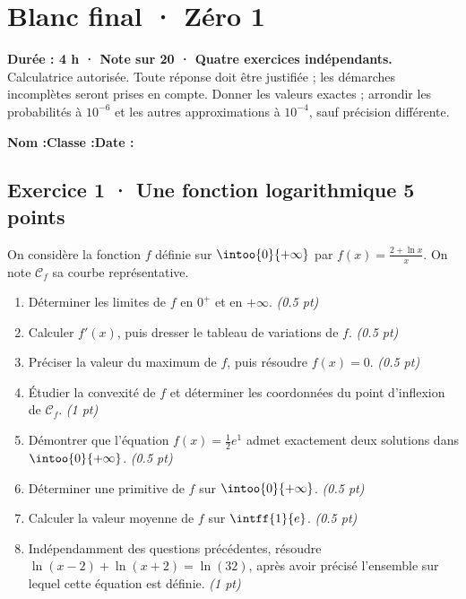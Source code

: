 \mxnewpage{}\label{sujet:9-1}

\section*{Blanc final · Zéro 1}


\textbf{Durée : 4 h · Note sur 20 · Quatre exercices indépendants.}\\Calculatrice autorisée. Toute réponse doit être justifiée ; les démarches incomplètes seront prises en compte. Donner les valeurs exactes ; arrondir les probabilités à $10^{-6}$ et les autres approximations à $10^{-4}$, sauf précision différente.

\smallskip\textbf{Nom :}\enspace\dotfill\quad\textbf{Classe :}\enspace\dotfill\quad\textbf{Date :}\enspace\dotfill

\subsection*{Exercice 1 · Une fonction logarithmique \hfill 5 points}On considère la fonction $f$ définie sur $\intoo{0}{+\infty}$ par $f(x)=\frac{2+\ln x}x$. On note $\mathcal C_f$ sa courbe représentative.

\begin{enumerate}

\item Déterminer les limites de $f$ en $0^+$ et en $+\infty$. \hfill\textit{(\num{0,5} pt)}

\item Calculer $f' (x)$, puis dresser le tableau de variations de $f$. \hfill\textit{(\num{0,5} pt)}

\item Préciser la valeur du maximum de $f$, puis résoudre $f(x)=0$. \hfill\textit{(\num{0,5} pt)}

\item Étudier la convexité de $f$ et déterminer les coordonnées du point d'inflexion de $\mathcal C_f$. \hfill\textit{(1 pt)}

\item Démontrer que l'équation $f(x)=\frac12 e^{1}$ admet exactement deux solutions dans $\intoo{0}{+\infty}$. \hfill\textit{(\num{0,5} pt)}

\item Déterminer une primitive de $f$ sur $\intoo{0}{+\infty}$. \hfill\textit{(\num{0,5} pt)}

\item Calculer la valeur moyenne de $f$ sur $\intff{1}{e}$. \hfill\textit{(\num{0,5} pt)}

\item Indépendamment des questions précédentes, résoudre $\ln(x-2)+\ln(x+2)=\ln(32)$, après avoir précisé l'ensemble sur lequel cette équation est définie. \hfill\textit{(1 pt)}

\end{enumerate}

